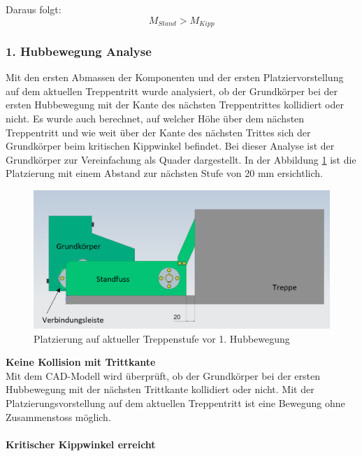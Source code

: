 Daraus folgt:
\[M_{Stand} > M_{Kipp}\]

\subsubsection{1. Hubbewegung Analyse}
\label{sec:hubbewegung-analyse}
Mit den ersten Abmassen der Komponenten und der ersten Platziervorstellung auf dem aktuellen Treppentritt wurde analysiert, ob der Grundkörper bei der ersten Hubbewegung mit der Kante des nächsten Treppentrittes kollidiert oder nicht. Es wurde auch berechnet, auf welcher Höhe über dem nächsten Treppentritt und wie weit über der Kante des nächsten Trittes sich der Grundkörper beim kritischen Kippwinkel befindet. Bei dieser Analyse ist der Grundkörper zur Vereinfachung als Quader dargestellt. In der Abbildung \ref{fig:platzierung-auf-treppenstufe-hubbewegung-1} ist die Platzierung mit einem Abstand zur nächsten Stufe von 20 mm ersichtlich.

\begin{figure}[H]
  \includegraphics[width=1\textwidth]{img/Treppensteigen/Platzierung auf Treppe final.PNG}
  \centering
  \caption{Platzierung auf aktueller Treppenstufe vor 1. Hubbewegung}
  \label{fig:platzierung-auf-treppenstufe-hubbewegung-1}
\end{figure}

\textbf{Keine Kollision mit Trittkante}\\
Mit dem CAD-Modell wird überprüft, ob der Grundkörper bei der ersten Hubbewegung mit der nächsten Trittkante kollidiert oder nicht. Mit der Platzierungsvorstellung auf dem aktuellen Treppentritt ist eine Bewegung ohne Zusammenstoss möglich.\\
\\

\textbf{Kritischer Kippwinkel erreicht}\\


